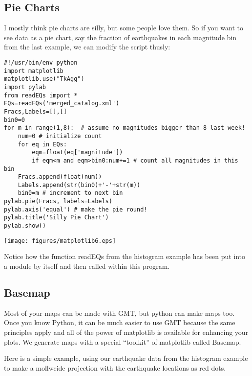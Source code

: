 {{{\subsection{Pie Charts}

I mostly think pie charts are silly, but some people love them.  So if you want to see  data as a pie chart, say the fraction of earthquakes in each magnitude bin from the last example, we can modify the script thusly:


{\singlespacing \color{blue} \begin{verbatim}
#!/usr/bin/env python
import matplotlib
matplotlib.use("TkAgg")
import pylab
from readEQs import *
EQs=readEQs('merged_catalog.xml')
Fracs,Labels=[],[]
bin0=0
for m in range(1,8):  # assume no magnitudes bigger than 8 last week!
    num=0 # initialize count
    for eq in EQs:
        eqm=float(eq['magnitude'])
        if eqm<m and eqm>bin0:num+=1 # count all magnitudes in this bin
    Fracs.append(float(num))
    Labels.append(str(bin0)+'-'+str(m))
    bin0=m # increment to next bin
pylab.pie(Fracs, labels=Labels) 
pylab.axis('equal') # make the pie round!
pylab.title('Silly Pie Chart')
pylab.show()  
\end{verbatim}}
\texttt{[image: figures/matplotlib6.eps]}}

\noindent Notice how the function {\color{blue}readEQs} from the histogram example has been put into a module by itself and then called within this program.  



\subsection{Basemap}

Most of your maps can be made  with GMT, but python can make maps too.   Once you know Python, it can be much easier to use GMT because the same principles apply and all of the power of {\color{blue}matplotlib} is available for enhancing your plots.  We generate maps with a special ``toolkit'' of {\color{blue}matplotlib}  called {\color{blue}Basemap}.     


Here is a simple example, using our earthquake data from the histogram example to make a mollweide projection with the earthquake locations as red dots.


}}
